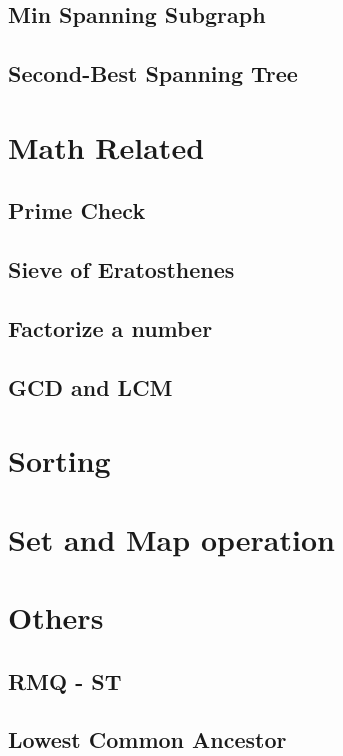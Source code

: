 	\subsection{Min Spanning Subgraph}
	\subsection{Second-Best Spanning Tree}
		

\section{Math Related}
	\subsection{Prime Check}
	\subsection{Sieve of Eratosthenes}
	\subsection{Factorize a number}
	\subsection{GCD and LCM}

\section{Sorting}

\section{Set and Map operation}
	
\section{Others}
	\subsection{RMQ - ST}
	\subsection{Lowest Common Ancestor}
